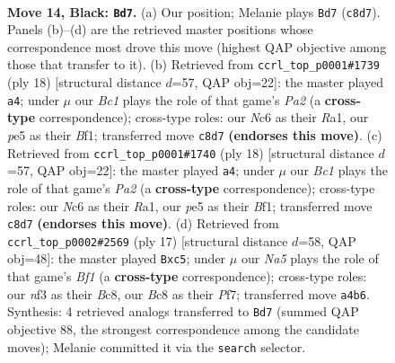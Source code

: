 \documentclass[11pt]{article}
\begin{document}
\clearpage

\begin{figure}[p]\centering
\begin{subfigure}{0.46\textwidth}\centering
\resizebox{\linewidth}{!}{%
\newchessgame
\chessboard[
  setfen={1rb1kb1r/1p3ppp/p1n1p3/4P3/n7/4BNP1/PPK2P1P/RN3B1R b k - 5 14},
  showmover=false,
  pgfstyle=straightmove, color=movearrow, markmove={c8-d7}
]}
\caption{}
\end{subfigure}\hfill
\begin{subfigure}{0.46\textwidth}\centering
\resizebox{\linewidth}{!}{%
\newchessgame
\chessboard[
  setfen={r1bk3r/ppp2pbp/5np1/4p3/2P1P3/2N3P1/PP3P1P/R1B1KB1R w KQ - 0 10},
  showmover=false,
  pgfstyle=straightmove, color=movearrow, markmove={a2-a4}
]}
\caption{}
\end{subfigure}
\\[4pt]
\begin{subfigure}{0.46\textwidth}\centering
\resizebox{\linewidth}{!}{%
\newchessgame
\chessboard[
  setfen={r1bk3r/ppp2pbp/5np1/4p3/2P1P3/2N3P1/PP3P1P/R1B1KB1R w KQ - 0 10},
  showmover=false,
  pgfstyle=straightmove, color=movearrow, markmove={a2-a4}
]}
\caption{}
\end{subfigure}\hfill
\begin{subfigure}{0.46\textwidth}\centering
\resizebox{\linewidth}{!}{%
\newchessgame
\chessboard[
  setfen={r1b1kb1r/1p3ppp/p1n1pn2/2P5/2B5/4PN1P/PP3PP1/RNBR2K1 b kq - 0 9},
  showmover=false,
  pgfstyle=straightmove, color=movearrow, markmove={f8-c5}
]}
\caption{}
\end{subfigure}
\caption{\textbf{Move 14, Black: \texttt{Bd7}.} (a) Our position; Melanie plays \texttt{Bd7} (\texttt{c8d7}). Panels (b)--(d) are the retrieved master positions whose correspondence most drove this move (highest QAP objective among those that transfer to it). (b) Retrieved from \texttt{ccrl\_top\_p0001\#1739} (ply 18) [structural distance $d$=57, QAP obj=22]: the master played \texttt{a4}; under $\mu$ our \emph{Bc1} plays the role of that game's \emph{Pa2} (a \textbf{cross-type} correspondence); cross-type roles: our \emph{N}c6 as their \emph{R}a1, our \emph{p}e5 as their \emph{B}f1; transferred move \texttt{c8d7} \textbf{(endorses this move)}. (c) Retrieved from \texttt{ccrl\_top\_p0001\#1740} (ply 18) [structural distance $d$=57, QAP obj=22]: the master played \texttt{a4}; under $\mu$ our \emph{Bc1} plays the role of that game's \emph{Pa2} (a \textbf{cross-type} correspondence); cross-type roles: our \emph{N}c6 as their \emph{R}a1, our \emph{p}e5 as their \emph{B}f1; transferred move \texttt{c8d7} \textbf{(endorses this move)}. (d) Retrieved from \texttt{ccrl\_top\_p0002\#2569} (ply 17) [structural distance $d$=58, QAP obj=48]: the master played \texttt{Bxc5}; under $\mu$ our \emph{Na5} plays the role of that game's \emph{Bf1} (a \textbf{cross-type} correspondence); cross-type roles: our \emph{n}f3 as their \emph{B}c8, our \emph{B}c8 as their \emph{P}f7; transferred move \texttt{a4b6}. Synthesis: 4 retrieved analogs transferred to \texttt{Bd7} (summed QAP objective 88, the strongest correspondence among the candidate moves); Melanie committed it via the \texttt{search} selector.}
\label{fig:thought-m27}
\end{figure}
\end{document}
